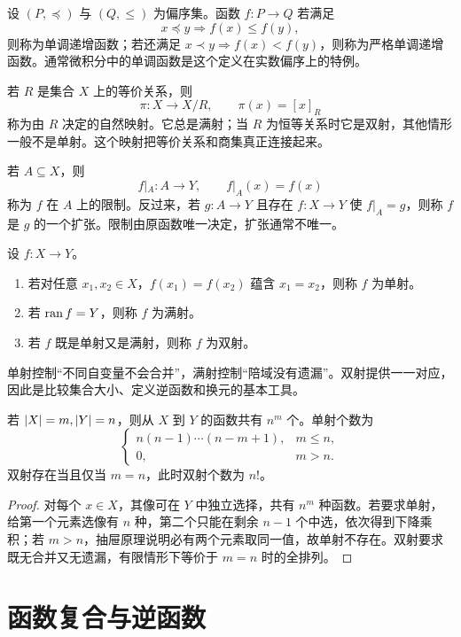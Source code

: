 设 $(P,\preceq)$ 与 $(Q,\le)$ 为偏序集。函数 $f:P\to Q$ 若满足
\[
x\preceq y\Longrightarrow f(x)\le f(y),
\]
则称为单调递增函数；若还满足 $x\prec y\Longrightarrow f(x)<f(y)$，则称为严格单调递增函数。通常微积分中的单调函数是这个定义在实数偏序上的特例。

若 $R$ 是集合 $X$ 上的等价关系，则
\[
\pi:X\to X/R,\qquad \pi(x)=[x]_R
\]
称为由 $R$ 决定的自然映射。它总是满射；当 $R$ 为恒等关系时它是双射，其他情形一般不是单射。这个映射把等价关系和商集真正连接起来。

若 $A\subseteq X$，则
\[
f|_A:A\to Y,\qquad f|_A(x)=f(x)
\]
称为 $f$ 在 $A$ 上的限制。反过来，若 $g:A\to Y$ 且存在 $f:X\to Y$ 使 $f|_A=g$，则称 $f$ 是 $g$ 的一个扩张。限制由原函数唯一决定，扩张通常不唯一。

\begin{definition}[单射、满射、双射]\label{function-types}
  设 $f:X\to Y$。
  \begin{enumerate}
    \item 若对任意 $x_1,x_2\in X$，$f(x_1)=f(x_2)$ 蕴含 $x_1=x_2$，则称 $f$ 为单射。
    \item 若 $\operatorname{ran} f=Y$，则称 $f$ 为满射。
    \item 若 $f$ 既是单射又是满射，则称 $f$ 为双射。
  \end{enumerate}
\end{definition}

单射控制“不同自变量不会合并”，满射控制“陪域没有遗漏”。双射提供一一对应，因此是比较集合大小、定义逆函数和换元的基本工具。

\begin{theorem}[有限集上的函数计数]\label{finite-function-count}
  若 $\lvert X\rvert=m,\lvert Y\rvert=n$，则从 $X$ 到 $Y$ 的函数共有 $n^m$ 个。单射个数为
  \[
  \begin{cases}
    n(n-1)\cdots(n-m+1),&m\le n,\\
    0,&m>n.
  \end{cases}
  \]
  双射存在当且仅当 $m=n$，此时双射个数为 $n!$。
\end{theorem}

\begin{proof}
  对每个 $x\in X$，其像可在 $Y$ 中独立选择，共有 $n^m$ 种函数。若要求单射，给第一个元素选像有 $n$ 种，第二个只能在剩余 $n-1$ 个中选，依次得到下降乘积；若 $m>n$，抽屉原理说明必有两个元素取同一值，故单射不存在。双射要求既无合并又无遗漏，有限情形下等价于 $m=n$ 时的全排列。
\end{proof}

\section{函数复合与逆函数}

